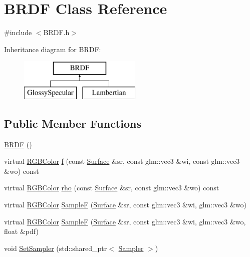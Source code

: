 \hypertarget{class_b_r_d_f}{}\section{B\+R\+DF Class Reference}
\label{class_b_r_d_f}


{\ttfamily \#include $<$B\+R\+D\+F.\+h$>$}

Inheritance diagram for B\+R\+DF\+:\begin{figure}[H]
\begin{center}
\leavevmode
\includegraphics[height=2.000000cm]{class_b_r_d_f}
\end{center}
\end{figure}
\subsection*{Public Member Functions}
\begin{DoxyCompactItemize}
\item 
\hyperlink{class_b_r_d_f_a453d38b012c433272b117864f1902c52}{B\+R\+DF} ()
\item 
virtual \hyperlink{class_r_g_b_color}{R\+G\+B\+Color} \hyperlink{class_b_r_d_f_af3d87a4237b7b25b72ad1fb5027721bb}{f} (const \hyperlink{class_surface}{Surface} \&sr, const glm\+::vec3 \&wi, const glm\+::vec3 \&wo) const
\item 
virtual \hyperlink{class_r_g_b_color}{R\+G\+B\+Color} \hyperlink{class_b_r_d_f_a676438154e142c5762193ee5251e4d57}{rho} (const \hyperlink{class_surface}{Surface} \&sr, const glm\+::vec3 \&wo) const
\item 
virtual \hyperlink{class_r_g_b_color}{R\+G\+B\+Color} \hyperlink{class_b_r_d_f_a50d4e9c4729dc37a80e1948e6b7995d6}{SampleF} (\hyperlink{class_surface}{Surface} \&sr, const glm\+::vec3 \&wi, glm\+::vec3 \&wo)
\item 
virtual \hyperlink{class_r_g_b_color}{R\+G\+B\+Color} \hyperlink{class_b_r_d_f_a2abfe6323b1d0035439dbc2234ad2a34}{SampleF} (\hyperlink{class_surface}{Surface} \&sr, const glm\+::vec3 \&wi, glm\+::vec3 \&wo, float \&pdf)
\item 
void \hyperlink{group___b_r_d_f_ga77a2a5e48ca3093d853e5713afa01108}{Set\+Sampler} (std\+::shared\+\_\+ptr$<$ \hyperlink{class_sampler}{Sampler} $>$)
\end{DoxyCompactItemize}
